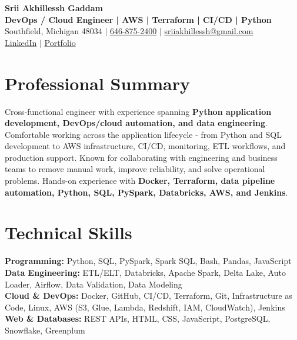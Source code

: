 \documentclass[letterpaper,10pt]{article}
\begin{document}
\fontsize{9.35pt}{10.45pt}\selectfont

\begin{center}
    {\LARGE \textbf{Srii Akhillessh Gaddam}} \\[-1pt]
    \textbf{DevOps / Cloud Engineer | AWS | Terraform | CI/CD | Python} \\[2pt]
    Southfield, Michigan 48034 $|$
    \href{tel:6468752400}{646-875-2400} $|$
    \href{mailto:sriiakhillessh@gmail.com}{sriiakhillessh@gmail.com} \\[1pt]
    \href{https://www.linkedin.com/in/srii-akhiilessh-gaddam-b48668191/}{LinkedIn} $|$
    \href{https://sriiakhillesshg.github.io/portfolio/}{Portfolio}
\end{center}
\vspace{-8pt}

\section{Professional Summary}
\small{Cross-functional engineer with experience spanning \textbf{Python application development, DevOps/cloud automation, and data engineering}. Comfortable working across the application lifecycle - from Python and SQL development to AWS infrastructure, CI/CD, monitoring, ETL workflows, and production support. Known for collaborating with engineering and business teams to remove manual work, improve reliability, and solve operational problems. Hands-on experience with \textbf{Docker, Terraform, data pipeline automation, Python, SQL, PySpark, Databricks, AWS, and Jenkins}.}

\section{Technical Skills}
\small{
\textbf{Programming:} Python, SQL, PySpark, Spark SQL, Bash, Pandas, JavaScript \\
\textbf{Data Engineering:} ETL/ELT, Databricks, Apache Spark, Delta Lake, Auto Loader, Airflow, Data Validation, Data Modeling \\
\textbf{Cloud \& DevOps:} Docker, GitHub, CI/CD, Terraform, Git, Infrastructure as Code, Linux, AWS (S3, Glue, Lambda, Redshift, IAM, CloudWatch), Jenkins \\
\textbf{Web \& Databases:} REST APIs, HTML, CSS, JavaScript, PostgreSQL, Snowflake, Greenplum
}
\end{document}
